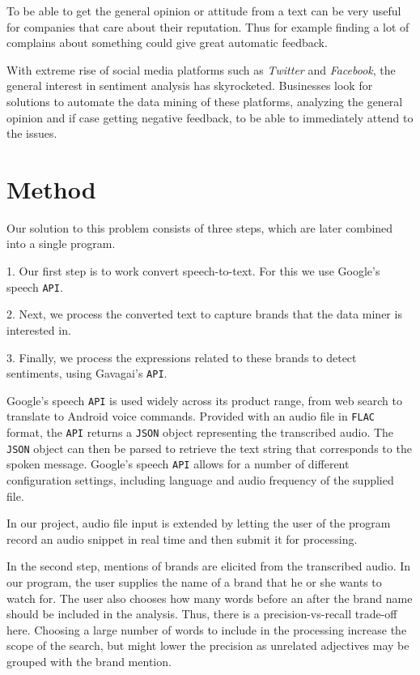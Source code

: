 \documentclass[a4paper,12pt,twoside]{ltxdoc}
\begin{document}
To be able to get the general opinion or attitude from a text can be very useful for companies that care about their reputation.
Thus for example finding a lot of complains about something could give great automatic feedback.

With extreme rise of social media platforms such as \emph{Twitter} and \emph{Facebook}, the general interest in sentiment analysis has skyrocketed. Businesses look for solutions to automate the data mining of these platforms, analyzing the general opinion and if case getting negative feedback, to be able to immediately attend to the issues.

\section{Method}

Our solution to this problem consists of three steps, which are later combined into a single program.

1. Our first step is to work convert speech-to-text. For this we use Google's speech \verb#API#.

2. Next, we process the converted text to capture brands that the data miner is interested in.

3. Finally, we process the expressions related to these brands to detect sentiments, using Gavagai's \verb#API#.

Google's speech \verb#API# is used widely across its product range, from web search to translate to Android voice commands.
Provided with an audio file in \verb#FLAC# format, the \verb#API# returns a \verb#JSON# object representing the transcribed audio. The \verb#JSON# object
can then be parsed to retrieve the text string that corresponds to the spoken message. Google's speech \verb#API# allows for a number
of different configuration settings, including language and audio frequency of the supplied file.

In our project, audio file input is extended by letting the user of the program record an audio snippet in real time and
then submit it for processing.

In the second step, mentions of brands are elicited from the transcribed audio. In our program, the user supplies the name
of a brand that he or she wants to watch for. The user also chooses how many words before an after the brand name should
be included in the analysis. Thus, there is a precision-vs-recall trade-off here. Choosing a large number of words to include
in the processing increase the scope of the search, but might lower the precision as unrelated adjectives may be grouped
with the brand mention.
\end{document}
